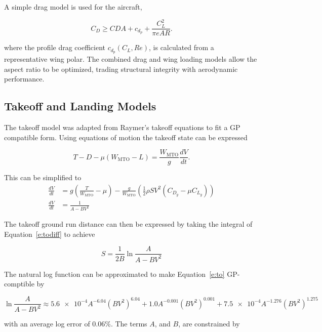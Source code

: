 \documentclass[]{aiaa-tc}%
\begin{document}
A simple drag model is used for the aircraft, 

\begin{equation}
    C_D \geq CDA + c_{d_p} + \frac{C_L^2}{\pi e AR}.
\end{equation}

where the profile drag coefficient $c_{d_p}(C_L, Re)$, is calculated from a representative wing polar. 
The combined drag and wing loading models allow the aspect ratio to be optimized, trading structural integrity with aerodynamic performance. 

\subsection{Takeoff and Landing Models}

The takeoff model was adapted from Raymer's takeoff equations to fit a GP compatible form.  Using equations of motion the takeoff state can be expressed

\begin{equation}
    T - D - \mu(W_{\mathrm{MTO}} - L) = \frac{W_{\mathrm{MTO}}}{g} \frac{dV}{dt}.
\end{equation}

This can be simplified to 
\begin{align}
    \frac{dV}{dt} &= g \left( \frac{T}{W_{\mathrm{MTO}}} - \mu \right) - \frac{g}{W_{\mathrm{MTO}}} \left( \frac{1}{2} \rho S V^2 (C_{D_g} - \mu C_{L_g})\right) \\
    \label{e:todiff}
    \frac{dV}{dt} &= \frac{1}{A-BV^2}
\end{align}

The takeoff ground run distance can then be expressed by taking the integral of Equation~\ref{e:todiff} to achieve

\begin{equation}
    \label{e:to}
    S = \frac{1}{2B} \ln{\frac{A}{A-BV^2}} 
\end{equation}

The natural log function can be approximated to make Equation~\ref{e:to} GP-comptible by 

\begin{equation}
    \ln{\frac{A}{A-BV^2}} \approx \num{5.6e-4} A^{-6.04} (BV^2)^{6.04} + 1.0 A^{-0.001} (BV^2)^{0.001} + \num{7.5e-4} A^{-1.276} (BV^2)^{1.275}
\end{equation}

with an average log error of 0.06\%.  The terms $A$, and $B$, are constrained by
\end{document}
